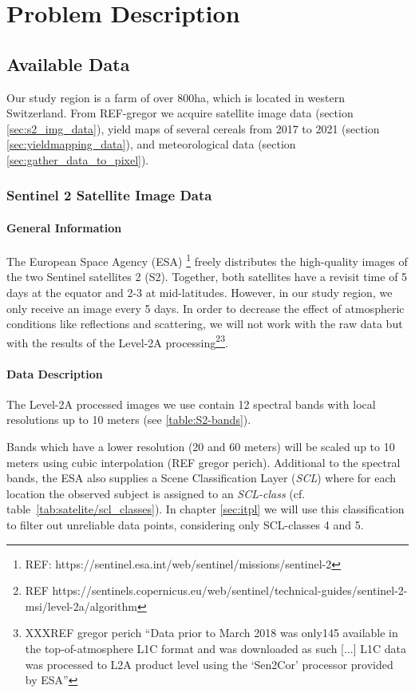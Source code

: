 \chapter{Problem Description}

\section{Available Data}
	{
		Our study region is a farm of over 800ha, which is located in western Switzerland. From REF-gregor we acquire satellite image data (section \ref{sec:s2_img_data}), yield maps of several cereals from 2017 to 2021 (section \ref{sec:yieldmapping_data}), and meteorological data (section \ref{sec:gather_data_to_pixel}).
	}

	\subsection{Sentinel 2 Satellite Image Data}{
		\label{sec:s2_img_data}
		\subsubsection*{General Information}{
			The European Space Agency (ESA) \footnote{REF: https://sentinel.esa.int/web/sentinel/missions/sentinel-2} freely distributes the high-quality images of the two Sentinel satellites 2 (S2). Together, both satellites have a revisit time of 5 days at the equator and 2-3 at mid-latitudes. However, in our study region, we only receive an image every 5 days.
			In order to decrease the effect of atmospheric conditions like reflections and scattering, we will not work with the raw data but with the results of the Level-2A processing\footnote{REF https://sentinels.copernicus.eu/web/sentinel/technical-guides/sentinel-2-msi/level-2a/algorithm}\footnote{XXXREF gregor perich ``Data prior to March 2018 was only145
			available in the top-of-atmosphere L1C format and was downloaded as such [...] L1C data was processed to L2A product level using the `Sen2Cor' processor provided by ESA''}. 
		}

		\subsubsection*{Data Description}{
			The Level-2A processed images we use contain 12 spectral bands with local resolutions up to 10 meters (see \ref{table:S2-bands}).   
			
			Bands which have a lower resolution (20 and 60 meters) will be scaled up to 10 meters using cubic interpolation (REF gregor perich).
			Additional to the spectral bands, the ESA also supplies a Scene Classification Layer (\textit{SCL}) where for each location the observed subject is assigned to an \textit{SCL-class} (cf. table~\ref{tab:satelite/scl_classes}). In chapter \ref{sec:itpl}  we will use this classification to filter out unreliable data points, considering only SCL-classes 4 and 5.  
			
}}
